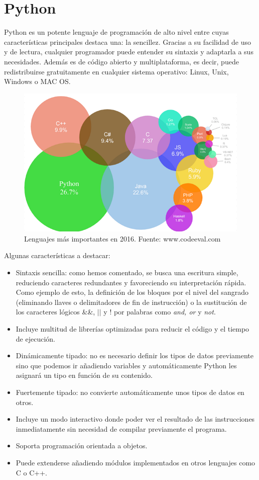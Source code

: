 \documentclass[a4paper, 12pt]{book}
\begin{document}
\section{Python} 
\label{sec:seccion2}
Python es un potente lenguaje de programación de alto nivel entre cuyas características principales destaca una: la sencillez. Gracias a su facilidad de uso y de lectura, cualquier programador puede entender su sintaxis y adaptarla a sus necesidades. Además es de código abierto y multiplataforma, es decir, puede redistribuirse gratuitamente en cualquier sistema operativo: Linux, Unix, Windows o MAC OS.
\begin{figure}[H]
  \centering
  \includegraphics[width=0.70\linewidth, keepaspectratio]{img/codeval2016}
  \caption{Lenguajes más importantes en 2016. Fuente: www.codeeval.com}
  \label{fig:codeval2016}
\end{figure}
Algunas características a destacar:
\begin{itemize}
	\item Sintaxis sencilla: como hemos comentado, se busca una escritura simple, reduciendo caracteres redundantes y favoreciendo su interpretación rápida. Como ejemplo de esto, la definición de los bloques por el nivel del sangrado (eliminando llaves o delimitadores de fin de instrucción) o la sustitución de los caracteres lógicos \&\&, \(\vert \vert\) y ! por palabras como \textit{and, or} y \textit{not}.   	
	\item Incluye multitud de librerías optimizadas para reducir el código y el tiempo de ejecución.
	\item Dinámicamente tipado: no es necesario definir los tipos de datos previamente sino que podemos ir añadiendo variables y automáticamente Python les asignará un tipo en función de su contenido. 
	\item Fuertemente tipado: no convierte automáticamente unos tipos de datos en otros.
	\item Incluye un modo interactivo donde poder ver el resultado de las instrucciones inmediatamente sin necesidad de compilar previamente el programa.
	\item Soporta programación orientada a objetos.
	\item Puede extenderse añadiendo módulos implementados en otros lenguajes como C o C++. 
\end{itemize}
\end{document}
